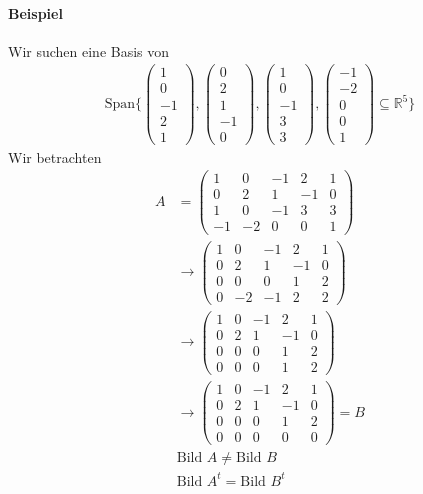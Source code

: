 \documentclass[11pt]{report}
\newcommand*\Zb[1] {\mathbb{#1}}
\begin{document}
\paragraph{Beispiel}
Wir suchen eine Basis von
\begin{align}
\text{Span}\{\begin{pmatrix} 1 \\ 0 \\ -1 \\ 2 \\ 1\end{pmatrix},\begin{pmatrix} 0 \\ 2 \\ 1 \\ -1 \\ 0\end{pmatrix},\begin{pmatrix}1 \\ 0 \\ -1 \\ 3 \\ 3 \end{pmatrix},\begin{pmatrix} -1 \\ -2 \\ 0 \\ 0 \\ 1\end{pmatrix}\subseteq \Zb{R}^5\}
\end{align}
Wir betrachten
\begin{align}
A &= \begin{pmatrix} 1 & 0 & -1 & 2 & 1 \\ 0 & 2 & 1 & -1 & 0 \\ 1 & 0 & -1 & 3 & 3 \\ -1 & -2 & 0 & 0 & 1\end{pmatrix} \\
&\rightarrow \begin{pmatrix} 1 & 0 & -1 & 2 & 1 \\ 0 & 2 & 1 & -1 & 0 \\ 0 & 0 & 0 & 1 & 2 \\ 0 & -2 & -1 & 2 & 2\end{pmatrix} \\
&\rightarrow \begin{pmatrix} 1 & 0 & -1 & 2 & 1 \\ 0 & 2 & 1 & -1 & 0 \\ 0 & 0 & 0 & 1 & 2 \\ 0 & 0 & 0 & 1 & 2 \end{pmatrix} \\
&\rightarrow \begin{pmatrix} 1 & 0 & -1 & 2 & 1 \\ 0 & 2 & 1 & -1 & 0 \\ 0 & 0 & 0 & 1 & 2 \\ 0 & 0 & 0 & 0 & 0 \end{pmatrix} = B \\
&\text{Bild } A \neq \text{Bild } B \\
&\text{Bild } A^t = \text{Bild } B^t
\end{align}
\end{document}
